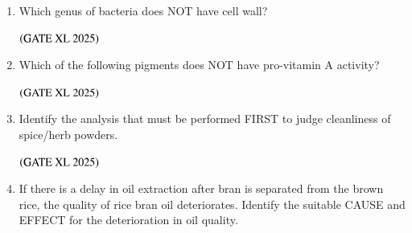 \documentclass[journal]{IEEEtran}
\begin{document}
\begin{enumerate}
    \item Which genus of bacteria does NOT have cell wall?

    \hfill $\left(\text{GATE XL 2025}\right)$
    \begin{enumerate}
    \end{enumerate}

    \item Which of the following pigments does NOT have pro-vitamin A activity?

    \hfill $\left(\text{GATE XL 2025}\right)$
    \begin{enumerate}
    \end{enumerate}

    \item Identify the analysis that must be performed FIRST to judge cleanliness of spice/herb powders.

    \hfill $\left(\text{GATE XL 2025}\right)$
    \begin{enumerate}
    \end{enumerate}

    \item If there is a delay in oil extraction after bran is separated from the brown rice, the quality of rice bran oil deteriorates. Identify the suitable CAUSE and EFFECT for the deterioration in oil quality.


\end{enumerate}
\end{document}
